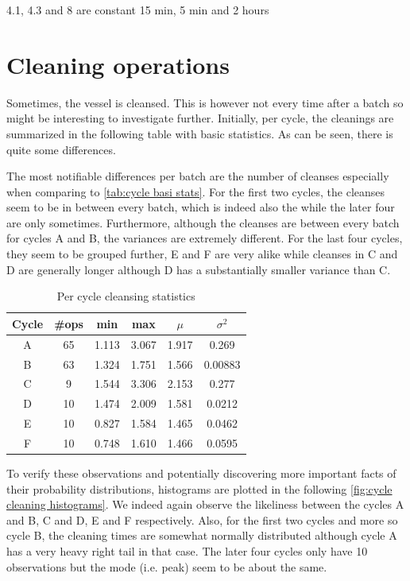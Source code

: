 \documentclass[../Thesis.tex]{subfiles}
\begin{document}
4.1, 4.3 and 8 are constant 15 min, 5 min and 2 hours




\newpage
\section{Cleaning operations}
Sometimes, the vessel is cleansed. This is however not every time after a batch so might be interesting to investigate further. Initially, per cycle, the cleanings are summarized in the following table with basic statistics. As can be seen, there is quite some differences.

The most notifiable differences per batch are the number of cleanses especially when comparing to \autoref{tab:cycle basi stats}. For the first two cycles, the cleanses seem to be in between every batch, which is indeed also the while the later four are only sometimes. Furthermore, although the cleanses are between every batch for cycles A and B, the variances are extremely different. For the last four cycles, they seem to be grouped further, E and F are very alike while cleanses in C and D are generally longer although D has a substantially smaller variance than C.

\begin{table}[h]
    \centering
    \begin{tabular}{c|c|c|c|c|c}
        Cycle & \#ops & min & max & $\mu$ & $\sigma^2$\\ \hline
        A & 65 & 1.113 & 3.067 & 1.917 & 0.269\\
        B & 63 & 1.324 & 1.751 & 1.566 & 0.00883\\
        C & 9  & 1.544 & 3.306 & 2.153 & 0.277\\
        D & 10 & 1.474 & 2.009 & 1.581 & 0.0212\\
        E & 10 & 0.827 & 1.584 & 1.465 & 0.0462\\
        F & 10 & 0.748 & 1.610 & 1.466 & 0.0595
    \end{tabular}
    \caption{Per cycle cleansing statistics}
    \label{tab:cycle cleansing stats stats}
\end{table}

To verify these observations and potentially discovering more important facts of their probability distributions, histograms are plotted in the following \autoref{fig:cycle cleaning histograms}. We indeed again observe the likeliness between the cycles A and B, C and D, E and F respectively. Also, for the first two cycles and more so cycle B, the cleaning times are somewhat normally distributed although cycle A has a very heavy right tail in that case. The later four cycles only have 10 observations but the mode (i.e. peak) seem to be about the same.
\end{document}
